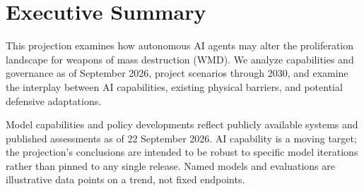 \documentclass[11pt,letterpaper]{article}
\begin{document}
\newpage

\section*{Executive Summary}

This projection examines how autonomous AI agents may alter the proliferation landscape for weapons of mass destruction (WMD). We analyze capabilities and governance as of September 2026, project scenarios through 2030, and examine the interplay between AI capabilities, existing physical barriers, and potential defensive adaptations.

\begin{notebox}
Model capabilities and policy developments reflect publicly available systems and published assessments as of 22 September 2026. AI capability is a moving target; the projection's conclusions are intended to be robust to specific model iterations rather than pinned to any single release. Named models and evaluations are illustrative data points on a trend, not fixed endpoints.
\end{notebox}
\end{document}
